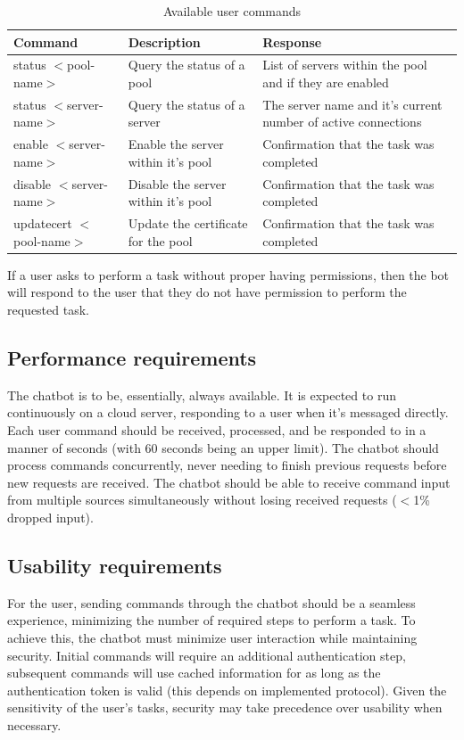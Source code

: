 \documentclass[onecolumn, draftclsnofoot,10pt, compsoc]{IEEEtran}
\begin{document}
\begin{table}[h]
    \caption{Available user commands}
    \begin{tabular}{ p{1.5in} p{2.5in} p{2.5in}  }
     \textbf{Command} & \textbf{Description} & \textbf{Response} \\
     \hline
     status $<$pool-name$>$
     & Query the status of a pool
     & List of servers within the pool and if they are enabled \\
     \hline
     status $<$server-name$>$
     & Query the status of a server
     & The server name and it's current number of active connections \\
     \hline
     enable $<$server-name$>$
     & Enable the server within it's pool
     & Confirmation that the task was completed \\
     \hline
     disable $<$server-name$>$
     & Disable the server within it's pool
     & Confirmation that the task was completed \\
     \hline
     updatecert $<$pool-name$>$
     & Update the certificate for the pool
     & Confirmation that the task was completed \\
     \hline
    \end{tabular}
    \label{tab:commands}
\end{table}

If a user asks to perform a task without proper having permissions, then the bot will respond to the user that they do not have permission to perform the requested task.

\subsection{Performance requirements}
The chatbot is to be, essentially, always available.
It is expected to run continuously on a cloud server, responding to a user when it's messaged directly.
Each user command should be received, processed, and be responded to in a manner of seconds (with 60 seconds being an upper limit).
The chatbot should process commands concurrently, never needing to finish previous requests before new requests are received.
The chatbot should be able to receive command input from multiple sources simultaneously without losing received requests ($<$1\% dropped input). 

\subsection{Usability requirements}
For the user, sending commands through the chatbot should be a seamless experience, minimizing the number of required steps to perform a task.
To achieve this, the chatbot must minimize user interaction while maintaining security.
Initial commands will require an additional authentication step, subsequent commands will use cached information for as long as the authentication token is valid (this depends on implemented protocol).
Given the sensitivity of the user's tasks, security may take precedence over usability when necessary.
\end{document}
